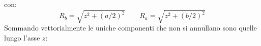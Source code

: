 \begin{Es}
\begin{figure}[htbp]
\end{figure}
con:
\begin{equation*}
 R_b = \sqrt{z^2+(a/2)^2}\qquad R_a = \sqrt{z^2+(b/2)^2}
\end{equation*}
Sommando vettorialmente le uniche componenti che non si annullano sono quelle lungo l'asse $z$:

\end{Es}
